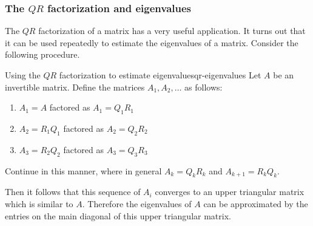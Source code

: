 \subsubsection{The $QR$ factorization and eigenvalues}

The $QR$ factorization of a matrix has a very useful application. It turns out that it can be used repeatedly to estimate the eigenvalues of a matrix. Consider the following procedure.

\begin{procedure}{Using the $QR$ factorization to estimate eigenvalues}{qr-eigenvalues}
Let $A$ be an invertible matrix. Define the matrices $A_1, A_2, \ldots$ as follows:
\begin{enumerate}
\item
$A_1 = A$ factored as $A_1 = Q_1R_1$
\item
$A_2 = R_1Q_1$ factored as $A_2 = Q_2R_2$
\item
$A_3 = R_2Q_2$ factored as $A_3 = Q_3R_3$
\end{enumerate}

Continue in this manner, where in general $A_k = Q_kR_k$ and $A_{k+1} = R_kQ_k$.

Then it follows that this sequence of $A_i$ converges to an upper triangular matrix which is similar to $A$. Therefore the eigenvalues of $A$ can be approximated by the entries on the main diagonal of this upper triangular matrix.
\end{procedure}
